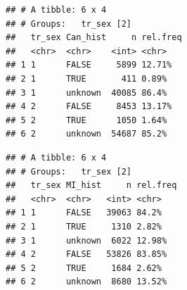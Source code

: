 \documentclass[]{article}
\newenvironment{Shaded}{\begin{snugshade}}{\end{snugshade}}
\newcommand{\DataTypeTok}[1]{\textcolor[rgb]{0.13,0.29,0.53}{#1}}
\newcommand{\DecValTok}[1]{\textcolor[rgb]{0.00,0.00,0.81}{#1}}
\newcommand{\KeywordTok}[1]{\textcolor[rgb]{0.13,0.29,0.53}{\textbf{#1}}}
\newcommand{\NormalTok}[1]{#1}
\newcommand{\OperatorTok}[1]{\textcolor[rgb]{0.81,0.36,0.00}{\textbf{#1}}}
\newcommand{\OtherTok}[1]{\textcolor[rgb]{0.56,0.35,0.01}{#1}}
\newcommand{\StringTok}[1]{\textcolor[rgb]{0.31,0.60,0.02}{#1}}
\begin{document}
\begin{verbatim}
## # A tibble: 6 x 4
## # Groups:   tr_sex [2]
##   tr_sex Can_hist     n rel.freq
##   <chr>  <chr>    <int> <chr>   
## 1 1      FALSE     5899 12.71%  
## 2 1      TRUE       411 0.89%   
## 3 1      unknown  40085 86.4%   
## 4 2      FALSE     8453 13.17%  
## 5 2      TRUE      1050 1.64%   
## 6 2      unknown  54687 85.2%
\end{verbatim}

\begin{Shaded}
\end{Shaded}

\begin{verbatim}
## # A tibble: 6 x 4
## # Groups:   tr_sex [2]
##   tr_sex MI_hist     n rel.freq
##   <chr>  <chr>   <int> <chr>   
## 1 1      FALSE   39063 84.2%   
## 2 1      TRUE     1310 2.82%   
## 3 1      unknown  6022 12.98%  
## 4 2      FALSE   53826 83.85%  
## 5 2      TRUE     1684 2.62%   
## 6 2      unknown  8680 13.52%
\end{verbatim}
\end{document}
